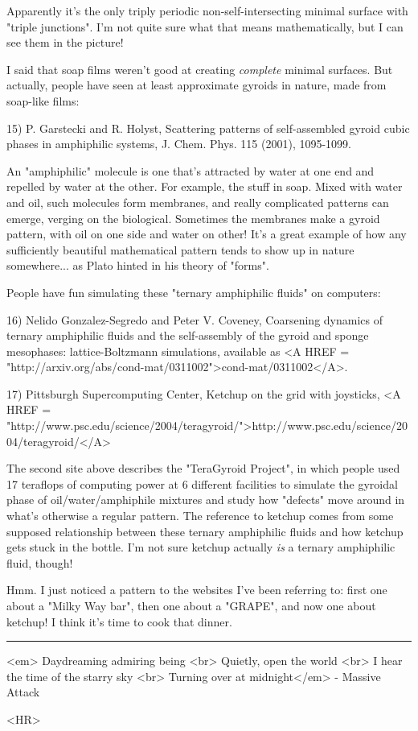 Apparently it's the only triply periodic non-self-intersecting 
minimal surface with "triple junctions".  I'm not quite 
sure what that means mathematically, but I can see them in the picture!

I said that soap films weren't good at creating \emph{complete} minimal
surfaces.  But actually, people have seen at least approximate gyroids
in nature, made from soap-like films:

15) P. Garstecki and R. Holyst, Scattering patterns of self-assembled 
gyroid cubic phases in amphiphilic systems, J. Chem. Phys. 115 (2001),
1095-1099.

An "amphiphilic" molecule is one that's attracted by water at one 
end and repelled by water at the other.  For example, the stuff in soap.
Mixed with water and oil, such 
molecules form membranes, and really complicated patterns can emerge,
verging on the biological.  Sometimes the membranes make a gyroid
pattern, with oil on one side and water on other!  It's a great example
of how any sufficiently beautiful mathematical pattern tends to show up
in nature somewhere... as Plato hinted in his theory of "forms".

People have fun simulating these "ternary amphiphilic fluids" 
on computers:

16) Nelido Gonzalez-Segredo and Peter V. Coveney, Coarsening dynamics of 
ternary amphiphilic fluids and the self-assembly of the gyroid and 
sponge mesophases: lattice-Boltzmann simulations, available as 
<A HREF = "http://arxiv.org/abs/cond-mat/0311002">cond-mat/0311002</A>.

17) Pittsburgh Supercomputing Center, Ketchup on the grid with joysticks,
<A HREF = "http://www.psc.edu/science/2004/teragyroid/">http://www.psc.edu/science/2004/teragyroid/</A>

The second site above describes the "TeraGyroid Project", in which
people used 17 teraflops of computing power at 6 different facilities 
to simulate the gyroidal phase of oil/water/amphiphile mixtures and 
study how "defects" move around in what's otherwise a regular 
pattern.  
The reference to ketchup comes from some supposed relationship between 
these ternary amphiphilic fluids and how ketchup gets stuck in
the bottle.  I'm not sure ketchup actually \emph{is} a ternary amphiphilic
fluid, though!

Hmm.  I just noticed a pattern to the websites I've been referring
to: first one about a "Milky Way bar", then one about 
a "GRAPE", and
now one about ketchup!  I think it's time to cook that dinner.



\par\noindent\rule{\textwidth}{0.4pt}
<em>
Daydreaming admiring being <br>
Quietly, open the world <br>
I hear the time of the starry sky <br>
Turning over at midnight</em> - Massive Attack

<HR>



